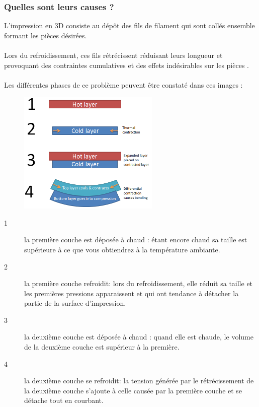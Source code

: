 \documentclass[11pt,a4paper]{article}
\begin{document}
		\subsubsection{Quelles sont leurs causes ?}L’impression en 3D consiste au dépôt des fils de filament qui sont collés ensemble formant les pièces désirées.
\\\\
Lors du refroidissement, ces fils rétrécissent réduisant leurs longueur et provoquant des contraintes cumulatives et des effets indésirables sur les pièces .
\\\\
Les différentes phases de ce problème peuvent être constaté dans ces images :
\begin{figure}[H]
\centering
\includegraphics[width=0.6\textwidth,cfbox=azul_marcos 4pt 0pt]{FOTOS/CAUSA_WARPING_1}
\end{figure}

\begin{description}
\item[1] la première couche est déposée à chaud : étant encore chaud sa taille est supérieure à ce que vous obtiendrez à la température ambiante.
\item[2] la première couche refroidit: lors du refroidissement, elle réduit sa taille et les premières pressions apparaissent et qui ont tendance à détacher la partie de la surface d’impression.
\item[3] la deuxième couche est déposée à chaud : quand elle est chaude, le volume de la deuxième couche est supérieur à la première.
\item[4] la deuxième couche se refroidit: la tension générée par le rétrécissement de la deuxième couche s’ajoute à celle causée par la première couche et se détache tout en courbant.
\end{description}
\end{document}
